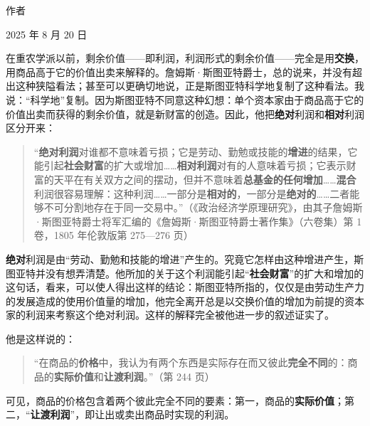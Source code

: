 \closing{作者}{2025 年 8 月 20 日}






在重农学派以前，剩余价值——即利润，利润形式的剩余价值——完全是用\textbf{交换}，用商品高于它的价值出卖来解释的。詹姆斯·斯图亚特爵士，总的说来，并没有超出这种狭隘看法；甚至可以更确切地说，正是斯图亚特科学地复制了这种看法。我说：“科学地”复制。因为斯图亚特不同意这种幻想：单个资本家由于商品高于它的价值出卖而获得的剩余价值，就是新财富的创造。因此，他把\textbf{绝对}利润和\textbf{相对}利润区分开来：

\begin{quote}“\textbf{绝对利润}对谁都不意味着亏损；它是劳动、勤勉或技能的\textbf{增进}的结果，它能引起\textbf{社会财富}的扩大或增加……\textbf{相对利润}对有的人意味着亏损；它表示财富的天平在有关双方之间的摆动，但并不意味着\textbf{总基金的任何增加}……\textbf{混合}利润很容易理解：这种利润……一部分是\textbf{相对的}，一部分是\textbf{绝对的}……二者能够不可分割地存在于同一交易中。”（《政治经济学原理研究》，由其子詹姆斯·斯图亚特爵士将军汇编的《詹姆斯·斯图亚特爵士著作集》（六卷集）第 1 卷，1805 年伦敦版第 275—276 页）\end{quote}

\textbf{绝对}利润是由“劳动、勤勉和技能的增进”产生的。究竟它怎样由这种增进产生，斯图亚特并没有想弄清楚。他所加的关于这个利润能引起“\textbf{社会财富}”的扩大和增加的这句话，看来，可以使人得出这样的结论：斯图亚特所指的，仅仅是由劳动生产力的发展造成的使用价值量的增加，他完全离开总是以交换价值的增加为前提的资本家的利润来考察这个绝对利润。这样的解释完全被他进一步的叙述证实了。


他是这样说的：

\begin{quote}“在商品的\textbf{价格}中，我认为有两个东西是实际存在而又彼此\textbf{完全不同}的：商品的\textbf{实际价值}和\textbf{让渡利润}。”（第 244 页）\end{quote}

可见，商品的价格包含着两个彼此完全不同的要素：第一，商品的\textbf{实际价值}；第二，“\textbf{让渡利润}”，即让出或卖出商品时实现的利润。

